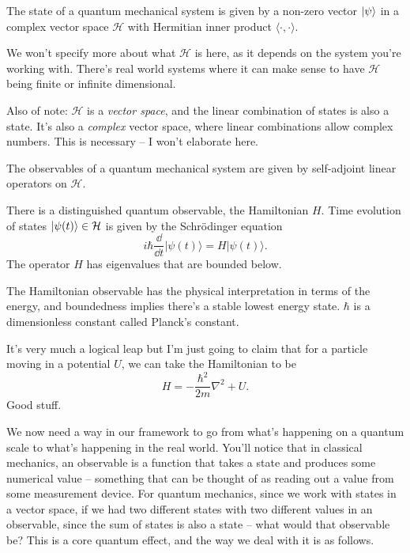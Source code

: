 \documentclass[a4paper]{article}
\begin{document}
\begin{axiom}[States]
    The state of a quantum mechanical system is given by a non-zero vector $\ket{\psi}$ in a complex vector space $\mathcal{H}$ with Hermitian inner product $\langle \cdot, \cdot \rangle$.
\end{axiom}

We won't specify more about what $\mathcal{H}$ is here, as it depends on the system you're working with. There's real world systems where it can make sense to have $\mathcal{H}$ being finite or infinite dimensional.

Also of note: $\mathcal{H}$ is a \emph{vector space}, and the linear combination of states is also a state. It's also a \emph{complex} vector space, where linear combinations allow complex numbers. This is necessary -- I won't elaborate here.

\begin{axiom}[Observables]
    The observables of a quantum mechanical system are given by self-adjoint linear operators on $\mathcal{H}$.
\end{axiom}

\begin{axiom}[Dynamics]
    There is a distinguished quantum observable, the Hamiltonian $H$. Time evolution of states $\ket{\psi(t)} \in \mathcal{H}$ is given by the Schrödinger equation
    $$
    i \hbar \frac{\dd}{\dd t}|\psi(t)\rangle=H|\psi(t)\rangle.
    $$
    The operator $H$ has eigenvalues that are bounded below.
\end{axiom}

The Hamiltonian observable has the physical interpretation in terms of the energy, and boundedness implies there's a stable lowest energy state. 
$\hbar$ is a dimensionless constant called Planck's constant.

It's very much a logical leap but I'm just going to claim that for a particle moving in a potential $U$, we can take the Hamiltonian to be
$$
H = -\frac{\hbar^{2}}{2 m} \nabla^{2}+U.
$$
Good stuff.

We now need a way in our framework to go from what's happening on a quantum scale to what's happening in the real world. You'll notice that in classical mechanics, an observable is a function that takes a state and produces some numerical value -- something that can be thought of as reading out a value from some measurement device. For quantum mechanics, since we work with states in a vector space, if we had two different states with two different values in an observable, since the sum of states is also a state -- what would that observable be? This is a core quantum effect, and the way we deal with it is as follows.
\end{document}
